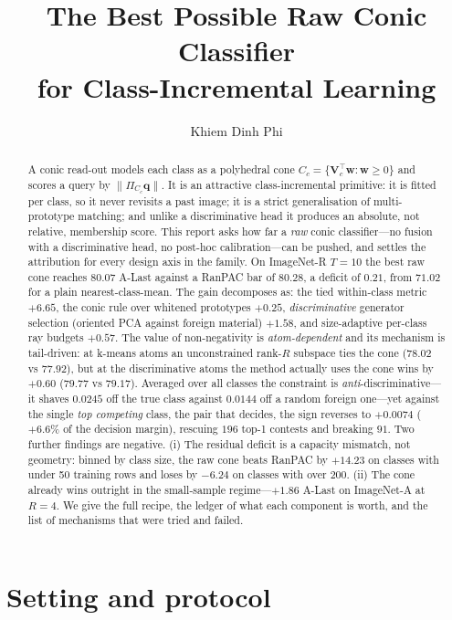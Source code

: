\documentclass[10pt,twocolumn]{article}
\title{\bf The Best Possible Raw Conic Classifier\\for Class-Incremental Learning}
\author{Khiem Dinh Phi}
\date{}
\newcommand{\bq}{\mathbf{q}}
\newcommand{\bw}{\mathbf{w}}
\newcommand{\bV}{\mathbf{V}}
\begin{document}
\maketitle

\begin{abstract}
A conic read-out models each class as a polyhedral cone $C_c=\{\bV_c^{\!\top}\bw:\bw\ge0\}$
and scores a query by $\lVert\Pi_{C_c}\bq\rVert$. It is an attractive
class-incremental primitive: it is fitted per class, so it never revisits a past
image; it is a strict generalisation of multi-prototype matching; and unlike a
discriminative head it produces an absolute, not relative, membership score.
This report asks how far a \emph{raw} conic classifier---no fusion with a
discriminative head, no post-hoc calibration---can be pushed, and settles the
attribution for every design axis in the family. On ImageNet-R $T{=}10$ the best
raw cone reaches $\mathbf{80.07}$ A-Last against a RanPAC bar of $80.28$, a
deficit of $0.21$, from $71.02$ for a plain nearest-class-mean. The gain
decomposes as: the tied within-class metric $+6.65$, the conic rule over
whitened prototypes $+0.25$, \emph{discriminative} generator selection (oriented
PCA against foreign material) $+1.58$, and size-adaptive per-class ray budgets
$+0.57$. The value of non-negativity is
\emph{atom-dependent} and its mechanism is tail-driven: at k-means atoms an
unconstrained rank-$R$ subspace ties the cone ($78.02$ vs $77.92$), but at the
discriminative atoms the method actually uses the cone wins by $+0.60$
($79.77$ vs $79.17$). Averaged over all classes the constraint is
\emph{anti}-discriminative---it shaves $0.0245$ off the true class against
$0.0144$ off a random foreign one---yet against the single \emph{top competing}
class, the pair that decides, the sign reverses to $+0.0074$ ($+6.6\%$ of the
decision margin), rescuing $196$ top-1 contests and breaking $91$. Two further
findings are negative. (i) The residual deficit is a capacity mismatch, not
geometry: binned by class size, the raw cone beats RanPAC by $+14.23$ on classes
with under 50 training rows and loses by $-6.24$ on classes with over 200.
(ii) The cone already wins outright in the small-sample regime---$+1.86$ A-Last
on ImageNet-A at $R{=}4$.
We give the full recipe, the ledger of what each component is worth, and the
list of mechanisms that were tried and failed.
\end{abstract}

\section{Setting and protocol}
\end{document}
